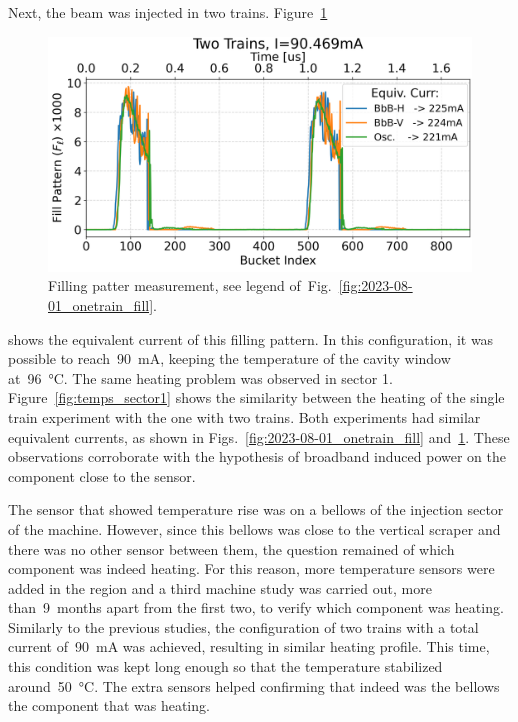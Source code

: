 \documentclass
[
    a4paper,
    nospread,     %
]{jacow}
\begin{document}
    Next, the beam was injected in two trains. Figure~\ref{fig:2023-08-01_twotrains_fill}
    \begin{figure}
        \centering
        \includegraphics[width=0.95\columnwidth]{THPC44_f5.png}
        \caption{Filling patter measurement, see legend of~Fig.~\ref{fig:2023-08-01_onetrain_fill}.}
        \label{fig:2023-08-01_twotrains_fill}
    \end{figure}
    shows the equivalent current of this filling pattern. In this configuration, it was possible to reach~\SI{90}{\milli\ampere}, keeping the temperature of the cavity window at~\SI{96}{\celsius}. The same heating problem was observed in sector 1. Figure~\ref{fig:temps_sector1} shows the similarity between the heating of the single train experiment with the one with two trains. Both experiments had similar equivalent currents, as shown in Figs.~\ref{fig:2023-08-01_onetrain_fill} and~\ref{fig:2023-08-01_twotrains_fill}. These observations corroborate with the hypothesis of broadband induced power on the component close to the sensor.

    The sensor that showed temperature rise was on a bellows of the injection sector of the machine. However, since this bellows was close to the vertical scraper and there was no other sensor between them, the question remained of which component was indeed heating. For this reason, more temperature sensors were added in the region and a third machine study was carried out, more than~\num{9}~months apart from the first two, to verify which component was heating. Similarly to the previous studies, the configuration of two trains with a total current of~\SI{90}{\milli\ampere} was achieved, resulting in similar heating profile. This time, this condition was kept long enough so that the temperature stabilized around~\SI{50}{\celsius}. The extra sensors helped confirming that indeed was the bellows the component that was heating.
    
\end{document}
